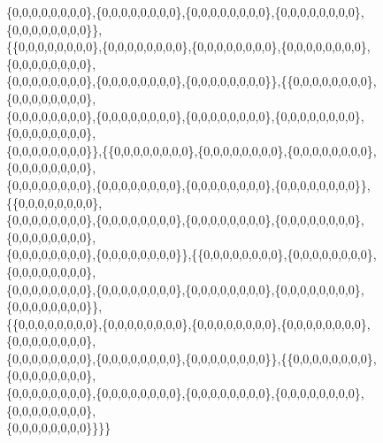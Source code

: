 \documentclass[a4paper,11pt]{jbook}
\theoremstyle{plain}
\theoremstyle{definition}
\theoremstyle{remark}
\theoremstyle{proof}
\numberwithin{equation}{section}
\begin{document}
\begin{doublespace}
\{0,0,0,0,0,0,0,0\},\{0,0,0,0,0,0,0,0\},\{0,0,0,0,0,0,0,0\},\{0,0,0,0,0,0,0,0\},\{0,0,0,0,0,0,0,0\}\}, \\
\{\{0,0,0,0,0,0,0,0\},\{0,0,0,0,0,0,0,0\},\{0,0,0,0,0,0,0,0\},\{0,0,0,0,0,0,0,0\},\{0,0,0,0,0,0,0,0\}, \\
\{0,0,0,0,0,0,0,0\},\{0,0,0,0,0,0,0,0\},\{0,0,0,0,0,0,0,0\}\},\{\{0,0,0,0,0,0,0,0\},\{0,0,0,0,0,0,0,0\}, \\
\{0,0,0,0,0,0,0,0\},\{0,0,0,0,0,0,0,0\},\{0,0,0,0,0,0,0,0\},\{0,0,0,0,0,0,0,0\},\{0,0,0,0,0,0,0,0\},\\
\{0,0,0,0,0,0,0,0\}\},\{\{0,0,0,0,0,0,0,0\},\{0,0,0,0,0,0,0,0\},\{0,0,0,0,0,0,0,0\},\{0,0,0,0,0,0,0,0\}, \\
\{0,0,0,0,0,0,0,0\},\{0,0,0,0,0,0,0,0\},\{0,0,0,0,0,0,0,0\},\{0,0,0,0,0,0,0,0\}\},\{\{0,0,0,0,0,0,0,0\}, \\
\{0,0,0,0,0,0,0,0\},\{0,0,0,0,0,0,0,0\},\{0,0,0,0,0,0,0,0\},\{0,0,0,0,0,0,0,0\},\{0,0,0,0,0,0,0,0\},\\
\{0,0,0,0,0,0,0,0\},\{0,0,0,0,0,0,0,0\}\},\{\{0,0,0,0,0,0,0,0\},\{0,0,0,0,0,0,0,0\},\{0,0,0,0,0,0,0,0\}, \\
\{0,0,0,0,0,0,0,0\},\{0,0,0,0,0,0,0,0\},\{0,0,0,0,0,0,0,0\},\{0,0,0,0,0,0,0,0\},\{0,0,0,0,0,0,0,0\}\}, \\
\{\{0,0,0,0,0,0,0,0\},\{0,0,0,0,0,0,0,0\},\{0,0,0,0,0,0,0,0\},\{0,0,0,0,0,0,0,0\},\{0,0,0,0,0,0,0,0\}, \\
\{0,0,0,0,0,0,0,0\},\{0,0,0,0,0,0,0,0\},\{0,0,0,0,0,0,0,0\}\},\{\{0,0,0,0,0,0,0,0\},\{0,0,0,0,0,0,0,0\}, \\
\{0,0,0,0,0,0,0,0\},\{0,0,0,0,0,0,0,0\},\{0,0,0,0,0,0,0,0\},\{0,0,0,0,0,0,0,0\},\{0,0,0,0,0,0,0,0\},\\
\{0,0,0,0,0,0,0,0\}\}\}\}\)
\end{doublespace}



\end{document}
